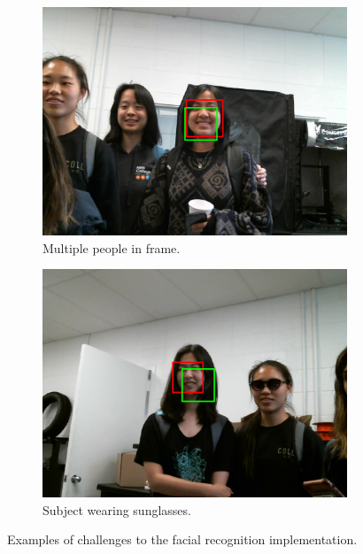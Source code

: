 \begin{figure}
    \centering
    \begin{subfigure}{0.4\linewidth}
        \includegraphics[width=\linewidth]{Thesis/ch5/multiple-faces.png}
        \caption{Multiple people in frame.}
        \label{fig:two-people}
    \end{subfigure}
    \begin{subfigure}{0.4\linewidth}
    \includegraphics[width=\linewidth]{Thesis/ch5/sunglasses.png}
    \caption{Subject wearing sunglasses.}
    \label{fig:sunglasses}
    \end{subfigure}
    \caption{Examples of challenges to the facial recognition implementation.}
    \label{fig:multiple-faces}
\end{figure}

